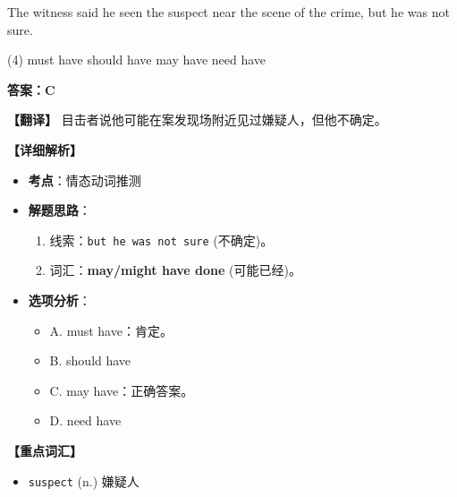 \documentclass[11pt, a4paper]{article}
\newcommand{\analysis}[4]{
    \begin{solutionbox}
        \textbf{答案：#1}
        
        \textbf{【翻译】} #2
        
        \textbf{【详细解析】}
        #3
        
        \textbf{【重点词汇】}
        #4
    \end{solutionbox}
}
\newcommand{\blank}{\underline{\hspace{1.5cm}}}
\begin{document}
\begin{questions}
    \item The witness said he \blank seen the suspect near the scene of the crime, but he was not sure.
    \begin{tasks}(4)
        \task must have \task should have \task may have \task need have
    \end{tasks}
    \analysis{C}{目击者说他可能在案发现场附近见过嫌疑人，但他不确定。}{
        \begin{itemize}
            \item \textbf{考点}：情态动词推测
            \item \textbf{解题思路}：
                \begin{enumerate}
                    \item 线索：\texttt{but he was not sure} (不确定)。
                    \item 词汇：\textbf{may/might have done} (可能已经)。
                \end{enumerate}
            \item \textbf{选项分析}：
                \begin{itemize}
                    \item A. must have：肯定。
                    \item B. should have
                    \item C. may have：正确答案。
                    \item D. need have
                \end{itemize}
        \end{itemize}
    }{
        \begin{itemize}
            \item \texttt{suspect} (n.) 嫌疑人
        \end{itemize}
    }


\end{questions}
\end{document}
